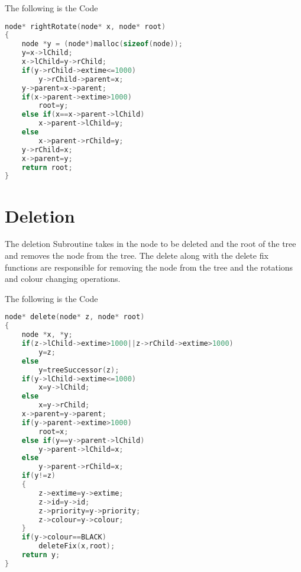 \documentclass{article}
\begin{document}
The following is the Code
\begin{lstlisting}[language=c, caption=Right]
node* rightRotate(node* x, node* root)
{
    node *y = (node*)malloc(sizeof(node));
    y=x->lChild;
    x->lChild=y->rChild;
    if(y->rChild->extime<=1000)
        y->rChild->parent=x;
    y->parent=x->parent;
    if(x->parent->extime>1000)
        root=y;
    else if(x==x->parent->lChild)
        x->parent->lChild=y;
    else
        x->parent->rChild=y;
    y->rChild=x;
    x->parent=y;
    return root;
}
\end{lstlisting}

\section{Deletion}

The deletion Subroutine takes in the node to be deleted and the root of the tree and removes the node from the tree. The delete along with the delete fix functions are responsible for removing the node from the tree and the rotations and colour changing operations.

The following is the Code
\begin{lstlisting}[language=c, caption=delete]
node* delete(node* z, node* root)
{
    node *x, *y;
    if(z->lChild->extime>1000||z->rChild->extime>1000)
        y=z;
    else
        y=treeSuccessor(z);
    if(y->lChild->extime<=1000)
        x=y->lChild;
    else
        x=y->rChild;
    x->parent=y->parent;
    if(y->parent->extime>1000)
        root=x;
    else if(y==y->parent->lChild)
        y->parent->lChild=x;
    else
        y->parent->rChild=x;
    if(y!=z)
    {
        z->extime=y->extime;
        z->id=y->id;
        z->priority=y->priority;
        z->colour=y->colour;
    }
    if(y->colour==BLACK)
        deleteFix(x,root);
    return y;
}
\end{lstlisting}
\end{document}
